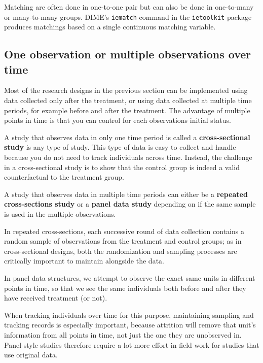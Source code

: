 Matching are often done in one-to-one pair but can also be done in one-to-many or many-to-many groups. DIME's \texttt{iematch} command in the \texttt{ietoolkit} package produces matchings based on a single continuous matching variable.




\subsection{One observation or multiple observations over time}

Most of the research designs in the previous section can be implemented 
using data collected only after the treatment, 
or using data collected at multiple time periods, 
for example before and after the treatment. 
The advantage of multiple points in time is 
that you can control for each observations initial status.

A study that observes data in only one time period is called 
a \textbf{cross-sectional study} is any type of study. 
This type of data is easy to collect and handle because
you do not need to track individuals across time. 
Instead, the challenge in a cross-sectional study is to
show that the control group is indeed a valid counterfactual to the treatment group.

A study that observes data in multiple time periods can either be a 
\textbf{repeated cross-sections study} or a \textbf{panel data study} 
depending on if the same sample is used in the multiple observations.

In repeated cross-sections, each successive round of data collection contains a random sample
of observations from the treatment and control groups;
as in cross-sectional designs, both the randomization and sampling processes
are critically important to maintain alongside the data.

In panel data structures, we attempt to observe the exact same units
in different points in time, so that we see the same individuals
both before and after they have received treatment (or not).

When tracking individuals over time for this purpose,
maintaining sampling and tracking records is especially important,
because attrition will remove that unit's information
from all points in time, not just the one they are unobserved in.
Panel-style studies therefore require a lot more effort in field work
for studies that use original data.

